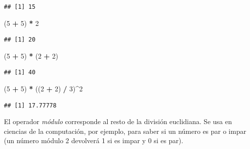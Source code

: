 \documentclass[]{book}
\newenvironment{Shaded}{\begin{snugshade}}{\end{snugshade}}
\newcommand{\DecValTok}[1]{\textcolor[rgb]{0.00,0.00,0.81}{#1}}
\newcommand{\StringTok}[1]{\textcolor[rgb]{0.31,0.60,0.02}{#1}}
\newcommand{\OperatorTok}[1]{\textcolor[rgb]{0.81,0.36,0.00}{\textbf{#1}}}
\newcommand{\NormalTok}[1]{#1}
\begin{document}
\begin{verbatim}
## [1] 15
\end{verbatim}

\begin{Shaded}
\begin{Highlighting}[]
\NormalTok{(}\DecValTok{5} \OperatorTok{+}\StringTok{ }\DecValTok{5}\NormalTok{) }\OperatorTok{*}\StringTok{ }\DecValTok{2}
\end{Highlighting}
\end{Shaded}

\begin{verbatim}
## [1] 20
\end{verbatim}

\begin{Shaded}
\begin{Highlighting}[]
\NormalTok{(}\DecValTok{5} \OperatorTok{+}\StringTok{ }\DecValTok{5}\NormalTok{) }\OperatorTok{*}\StringTok{ }\NormalTok{(}\DecValTok{2} \OperatorTok{+}\StringTok{ }\DecValTok{2}\NormalTok{)}
\end{Highlighting}
\end{Shaded}

\begin{verbatim}
## [1] 40
\end{verbatim}

\begin{Shaded}
\begin{Highlighting}[]
\NormalTok{(}\DecValTok{5} \OperatorTok{+}\StringTok{ }\DecValTok{5}\NormalTok{) }\OperatorTok{*}\StringTok{ }\NormalTok{((}\DecValTok{2} \OperatorTok{+}\StringTok{ }\DecValTok{2}\NormalTok{) }\OperatorTok{/}\StringTok{ }\DecValTok{3}\NormalTok{)}\OperatorTok{^}\DecValTok{2}
\end{Highlighting}
\end{Shaded}

\begin{verbatim}
## [1] 17.77778
\end{verbatim}

El operador \emph{módulo} corresponde al resto de la división
euclidiana. Se usa en ciencias de la computación, por ejemplo, para
saber si un número es par o impar (un número módulo 2 devolverá 1 si es
impar y 0 si es par).

\begin{Shaded}
\end{Shaded}
\end{document}

